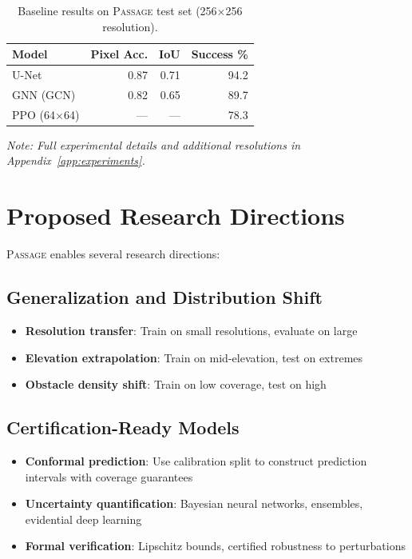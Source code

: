\documentclass{article}
\newcommand{\dataset}{\textsc{Passage}}
\begin{document}
\begin{table}[h]
\centering
\caption{Baseline results on \dataset{} test set (256$\times$256 resolution).}
\label{tab:baselines}
\begin{tabular}{lrrr}
\toprule
Model & Pixel Acc. & IoU & Success \% \\
\midrule
U-Net & 0.87 & 0.71 & 94.2 \\
GNN (GCN) & 0.82 & 0.65 & 89.7 \\
PPO (64$\times$64) & --- & --- & 78.3 \\
\bottomrule
\end{tabular}
\end{table}

\textit{Note: Full experimental details and additional resolutions in Appendix~\ref{app:experiments}.}

\section{Proposed Research Directions}
\label{sec:research}

\dataset{} enables several research directions:

\subsection{Generalization and Distribution Shift}

\begin{itemize}[noitemsep]
    \item \textbf{Resolution transfer}: Train on small resolutions, evaluate on large
    \item \textbf{Elevation extrapolation}: Train on mid-elevation, test on extremes
    \item \textbf{Obstacle density shift}: Train on low coverage, test on high
\end{itemize}

\subsection{Certification-Ready Models}

\begin{itemize}[noitemsep]
    \item \textbf{Conformal prediction}: Use calibration split to construct prediction intervals with coverage guarantees
    \item \textbf{Uncertainty quantification}: Bayesian neural networks, ensembles, evidential deep learning
    \item \textbf{Formal verification}: Lipschitz bounds, certified robustness to perturbations
\end{itemize}
\end{document}
